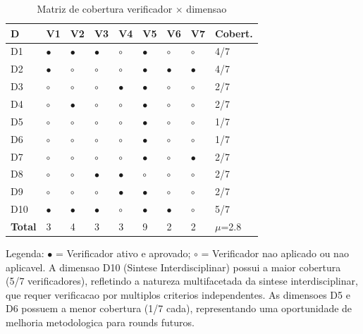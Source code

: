 \begin{table}[H]\centering\footnotesize
\caption{Matriz de cobertura verificador $\times$ dimensao}
\label{tab:verifier-matrix}
\begin{tabular}{p{}p{}p{}p{}p{}p{}p{}p{}p{}}
\toprule
\textbf{D} & \textbf{V1} & \textbf{V2} & \textbf{V3} & \textbf{V4} &
\textbf{V5} & \textbf{V6} & \textbf{V7} & \textbf{Cobert.} \\
\midrule
D1 & $\bullet$ & $\bullet$ & $\bullet$ & $\circ$ & $\bullet$ & $\circ$ & $\circ$ & 4/7 \\
D2 & $\bullet$ & $\circ$ & $\circ$ & $\circ$ & $\bullet$ & $\bullet$ & $\bullet$ & 4/7 \\
D3 & $\circ$ & $\circ$ & $\circ$ & $\bullet$ & $\bullet$ & $\circ$ & $\circ$ & 2/7 \\
D4 & $\circ$ & $\bullet$ & $\circ$ & $\circ$ & $\bullet$ & $\circ$ & $\circ$ & 2/7 \\
D5 & $\circ$ & $\circ$ & $\circ$ & $\circ$ & $\bullet$ & $\circ$ & $\circ$ & 1/7 \\
D6 & $\circ$ & $\circ$ & $\circ$ & $\circ$ & $\bullet$ & $\circ$ & $\circ$ & 1/7 \\
D7 & $\circ$ & $\circ$ & $\circ$ & $\circ$ & $\bullet$ & $\circ$ & $\bullet$ & 2/7 \\
D8 & $\circ$ & $\circ$ & $\bullet$ & $\bullet$ & $\circ$ & $\circ$ & $\circ$ & 2/7 \\
D9 & $\circ$ & $\circ$ & $\circ$ & $\bullet$ & $\bullet$ & $\circ$ & $\circ$ & 2/7 \\
D10 & $\bullet$ & $\bullet$ & $\bullet$ & $\circ$ & $\bullet$ & $\bullet$ & $\circ$ & 5/7 \\
\midrule
\textbf{Total} & 3 & 4 & 3 & 3 & 9 & 2 & 2 & $\mu$=2.8 \\
\bottomrule
\end{tabular}
\end{table}

Legenda: $\bullet$ = Verificador ativo e aprovado; $\circ$ = Verificador
nao aplicado ou nao aplicavel. A dimensao D10 (Sintese Interdisciplinar)
possui a maior cobertura (5/7 verificadores), refletindo a natureza
multifacetada da sintese interdisciplinar, que requer verificacao por
multiplos criterios independentes. As dimensoes D5 e D6 possuem a menor
cobertura (1/7 cada), representando uma oportunidade de melhoria
metodologica para rounds futuros.

